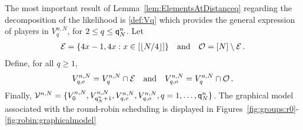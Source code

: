 The most important result of Lemma~\ref{lem:ElementsAtDistanceq} regarding the decomposition of the likelihood is \eqref{def:Vq} which provides the general expression of players in $V_{q}^{n,N}$, for $2\le q\le {\mathsf{q}}^{n}_{N}$. 
Let 
\begin{gather*}
\mathcal{E}=\{4x-1,4x : x\in[\left\lfloor N/4\right\rfloor]\}\quad\mbox{and}\quad \mathcal{O}=[N]\setminus\mathcal{E}\,.
\end{gather*}
Define, for all $q\ge 1$,
\[
V_{q,e}^{n,N}= V_{q}^{n,N}\cap \mathcal{E}\quad\mbox{and}\quad V_{q,o}^{n,N}= V_{q}^{n,N}\cap \mathcal{O}\,.
\]
Finally, $\mathcal{V}^{n,N}=\{V_0^{n,N},V_{{\mathsf{q}}^{n}_{N}+1}^{n,N},V_{q,e}^{n,N},V_{q,o}^{n,N},q=1,\ldots,{\mathsf{q}}^{n}_{N}\}$. The graphical model associated with the round-robin scheduling is displayed in Figures~\ref{fig:groups:r0}-\ref{fig:robin:graphicalmodel}


